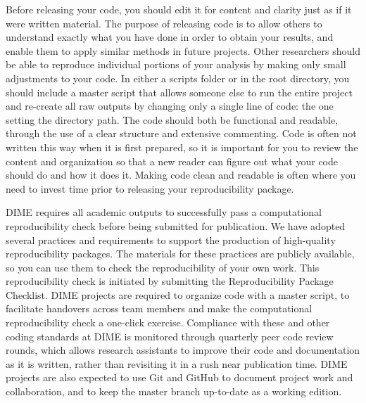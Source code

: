Before releasing your code, you should edit it for content and clarity
just as if it were written material.
The purpose of releasing code is to allow others to understand
exactly what you have done in order to obtain your results,
and enable them to apply similar methods in future projects.
Other researchers should be able to reproduce individual portions of your analysis
by making only small adjustments to your code.
In either a scripts folder or in the root directory,
you should include a master script that allows someone else to run the entire project
and re-create all raw outputs by changing only a single line of code:
the one setting the directory path.
The code should both be functional and readable,
through the use of a clear structure and extensive commenting.
Code is often not written this way when it is first prepared,
so it is important for you to review the content and organization
so that a new reader can figure out what your code should do and how it does it.
Making code clean and readable is often where you need to invest time prior to releasing your reproducibility package.

DIME requires all academic outputs to successfully pass a computational reproducibility check 
before being submitted for publication. 
We have adopted several practices and requirements to support the production
of high-quality reproducibility packages.
The materials for these practices are publicly available,
so you can use them to check the reproducibility of your own work.
This reproducibility check is initiated by submitting the Reproducibility Package Checklist.
DIME projects are required to organize code
with a master script, to facilitate handovers across team members 
and make the computational reproducibility check a one-click exercise.
Compliance with these and other coding standards at DIME is monitored through
quarterly peer code review rounds, which allows research assistants to improve their code and documentation as it is written,
rather than revisiting it in a rush near publication time.
DIME projects are also expected to use Git and GitHub
to document project work and collaboration,
and to keep the master branch up-to-date as a working edition.

